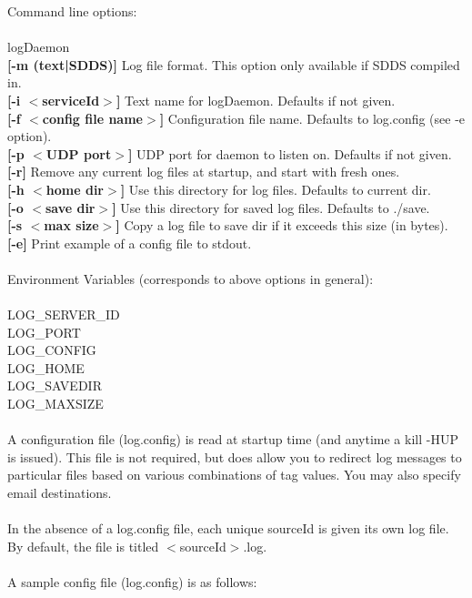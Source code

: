 \documentclass[11pt]{article}
\begin{document}
Command line options:\\
\\
logDaemon\\
{\bf [-m (text|SDDS)]} Log file format. This  option only available if SDDS compiled 
in.\\
{\bf [-i $<$serviceId$>$]} Text name for logDaemon. Defaults if not given.\\
{\bf [-f $<$config file name$>$]} Configuration file  name. Defaults to log.config (see -e 
option).\\
{\bf [-p $<$UDP port$>$]} UDP port for daemon to listen on. Defaults if not given.\\
{\bf [-r]} Remove any current log files at startup, and start with fresh ones.\\
{\bf [-h $<$home dir$>$]} Use this directory for log files. Defaults to current dir.\\
{\bf [-o $<$save dir$>$]} Use this directory for saved log files. Defaults to ./save.\\
{\bf [-s $<$max size$>$]} Copy a log file to save dir if it exceeds this size (in bytes).\\
{\bf [-e]} Print example of a config file to stdout.\\
\\
Environment Variables (corresponds to above options in general):\\
\\
LOG\_SERVER\_ID\\
LOG\_PORT\\
LOG\_CONFIG\\
LOG\_HOME\\
LOG\_SAVEDIR\\
LOG\_MAXSIZE\\
\\
A configuration file (log.config) is read at startup time (and anytime a kill -HUP is issued). This file is not required, but does allow you to redirect log messages to particular files based on various combinations of tag values. You may also specify email destinations.\\
\\
In the absence of a log.config file, each unique sourceId is given its own log file. By default, the file is titled $<$sourceId$>$.log.\\
\\
A sample config file (log.config) is as follows:
\end{document}
